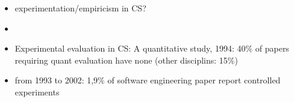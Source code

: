\begin{itemize}
\item experimentation/empiricism in CS?
\item {}
\item Experimental evaluation in CS: A quantitative study, 1994: 40\% of papers requiring quant evaluation have none (other disciplins: 15\%)
\item {} from 1993 to 2002: 1,9\% of software engineering paper report controlled experiments
\end{itemize}


















